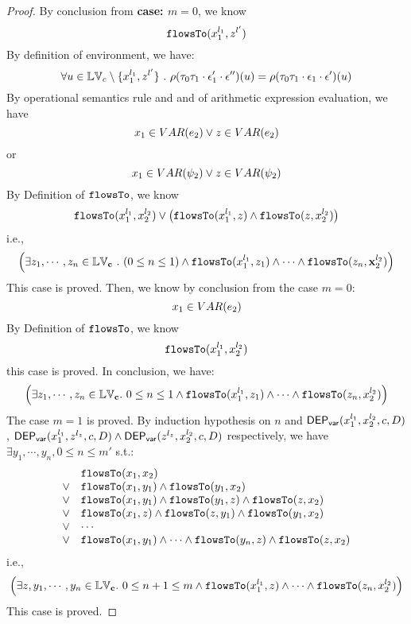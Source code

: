 \begin{proof}
%
%
By conclusion from \textbf{case: $m = 0$}, we know
\[
  \mathtt{flowsTo}(x_1^{l_1}, z^{l'})
\]
%
By definition of environment, we have:
\[
  \forall u \in \mathbb{LV}_c \setminus \{x_1^{l_1}, z^{l'}\} ~.~
  \rho(\mathtt{\tau}_0 \mathtt{\tau}_1 \cdot \mathtt{\epsilon}_1' \cdot \mathtt{\epsilon}'') (u) =  
  \rho(\mathtt{\tau}_0 \mathtt{\tau}_1 \cdot \mathtt{\epsilon}_1 \cdot \mathtt{\epsilon}') (u)
\]
By operational semantics rule  and  and  of arithmetic expression evaluation, we have 
\[
  x_1 \in VAR(e_2) \lor z \in VAR(e_2)
\]
or
\[
  x_1 \in VAR(\psi_2) \lor z \in VAR(\psi_2)
\]
%
By Definition of $\mathtt{flowsTo}$, we know
\[
  \mathtt{flowsTo}(x_1^{l_1}, x_2^{l_2}) \lor 
  \big(\mathtt{flowsTo}(x_1^{l_1}, z) \land \mathtt{flowsTo}(z, x_2^{l_2}) \big)
\]
%
i.e.,
%
\[
 \Big( \exists z_1, \cdots, z_n \in \mathbb{LV}_{{\boldsymbol{\mathbf{c}}}} ~.~ (0 \leq n \leq 1 )
 \land \mathtt{flowsTo}(x_1^{l_1}, z_1) \land \cdots \land \mathtt{flowsTo}(z_n, {\boldsymbol{\mathbf{x}}}_2^{l_2}) \Big)
\]
%
This case is proved.
%
Then, we know by conclusion from the case $m = 0$:
\[
  x_1 \in VAR(e_2)
\]
%
By Definition of $\mathtt{flowsTo}$, we know
\[
  \mathtt{flowsTo}(x_1^{l_1}, x_2^{l_2}) 
\]
this case is proved.
%
In conclusion, we have:
\[
  \Big( \exists z_1, \cdots, z_n \in \mathbb{LV}_{{\boldsymbol{\mathbf{c}}}}. ~ 0 \leq n \leq 1 \land
  \mathtt{flowsTo}(x_1^{l_1}, z_1) 
  \land \cdots \land \mathtt{flowsTo}(z_n, x_2^{l_2}) \Big)
\]
The case $m = 1$ is proved.
%
By induction hypothesis on $n$ and $\mathsf{DEP_{var}}(x_1^{l_1}, x_2^{l_2}, c, D)$, 
$\mathsf{DEP_{var}}(x_1^{l_1}, z^{l_z}, c, D) \land \mathsf{DEP_{var}}(z^{l_z}, x_2^{l_2}, c, D)$ respectively, 
we have $\exists y_1, \cdots, y_n, 0 \leq n \leq m'$ s.t.:
\[
\begin{array}{ll}
      & \mathtt{flowsTo}(x_1, x_2) \\
  \lor  & \mathtt{flowsTo}(x_1, y_1) \land \mathtt{flowsTo}(y_1, x_2)\\
  \lor  & \mathtt{flowsTo}(x_1, y_1) \land \mathtt{flowsTo}(y_1, z) \land \mathtt{flowsTo}(z, x_2) \\
  \lor  & \mathtt{flowsTo}(x_1, z) \land \mathtt{flowsTo}(z, y_1) \land \mathtt{flowsTo}(y_1, x_2) \\
  \lor  & \cdots \\
  \lor  & \mathtt{flowsTo}(x_1, y_1) \land \cdots \land \mathtt{flowsTo}(y_n, z) \land \mathtt{flowsTo}(z, x_2) \\
\end{array}
\]
i.e.,
\[
  \Big( \exists z, y_1, \cdots, y_n \in \mathbb{LV}_{{\boldsymbol{\mathbf{c}}}}. ~ 0 \leq n + 1 \leq m \land
  \mathtt{flowsTo}(x_1^{l_1}, z) 
  \land \cdots \land \mathtt{flowsTo}(z_n, x_2^{l_2}) \Big)
\]
This case is proved.


\end{proof}
